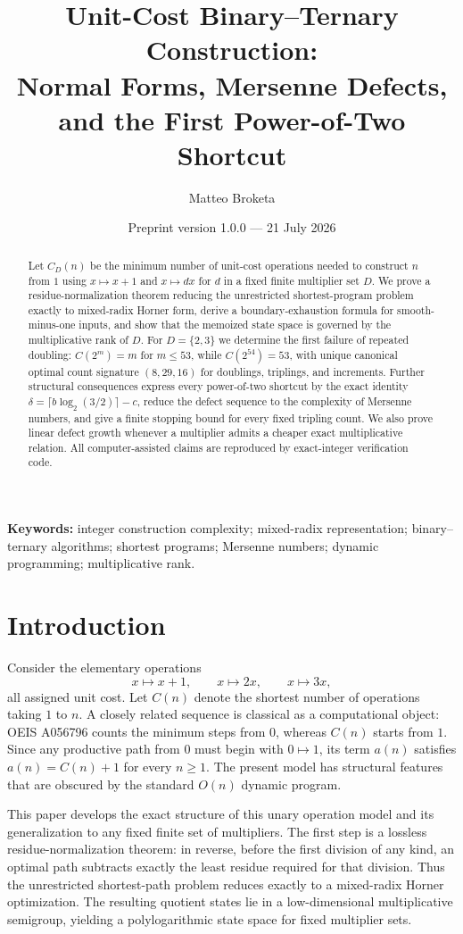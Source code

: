 \documentclass[11pt]{article}
\title{\textbf{Unit-Cost Binary--Ternary Construction:\\Normal Forms, Mersenne Defects, and the First Power-of-Two Shortcut}}
\author{Matteo Broketa}
\date{Preprint version 1.0.0 --- 21 July 2026}
\begin{document}
\maketitle

\begin{abstract}
Let $C_D(n)$ be the minimum number of unit-cost operations needed to construct $n$ from $1$ using $x\mapsto x+1$ and $x\mapsto dx$ for $d$ in a fixed finite multiplier set $D$. We prove a residue-normalization theorem reducing the unrestricted shortest-program problem exactly to mixed-radix Horner form, derive a boundary-exhaustion formula for smooth-minus-one inputs, and show that the memoized state space is governed by the multiplicative rank of $D$. For $D=\{2,3\}$ we determine the first failure of repeated doubling: $C(2^m)=m$ for $m\le53$, while $C(2^{54})=53$, with unique canonical optimal count signature $(8,29,16)$ for doublings, triplings, and increments. Further structural consequences express every power-of-two shortcut by the exact identity $\delta=\lceil b\log_2(3/2)\rceil-c$, reduce the defect sequence to the complexity of Mersenne numbers, and give a finite stopping bound for every fixed tripling count. We also prove linear defect growth whenever a multiplier admits a cheaper exact multiplicative relation. All computer-assisted claims are reproduced by exact-integer verification code.
\end{abstract}

\noindent\textbf{Keywords:} integer construction complexity; mixed-radix representation; binary--ternary algorithms; shortest programs; Mersenne numbers; dynamic programming; multiplicative rank.

\section{Introduction}
Consider the elementary operations
\[
 x\mapsto x+1,\qquad x\mapsto 2x,\qquad x\mapsto 3x,
\]
all assigned unit cost. Let $C(n)$ denote the shortest number of operations taking $1$ to $n$. A closely related sequence is classical as a computational object: OEIS A056796 counts the minimum steps from $0$, whereas $C(n)$ starts from $1$. Since any productive path from $0$ must begin with $0\mapsto1$, its term $a(n)$ satisfies $a(n)=C(n)+1$ for every $n\ge1$. The present model has structural features that are obscured by the standard $O(n)$ dynamic program.

This paper develops the exact structure of this unary operation model and its generalization to any fixed finite set of multipliers. The first step is a lossless residue-normalization theorem: in reverse, before the first division of any kind, an optimal path subtracts exactly the least residue required for that division. Thus the unrestricted shortest-path problem reduces exactly to a mixed-radix Horner optimization. The resulting quotient states lie in a low-dimensional multiplicative semigroup, yielding a polylogarithmic state space for fixed multiplier sets.
\end{document}

